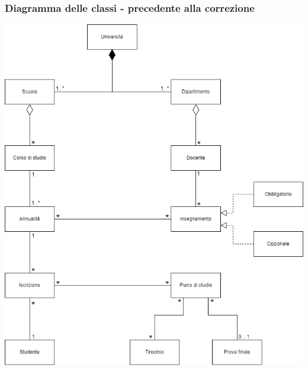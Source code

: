\documentclass{article}
\begin{document}
\subsubsection*{Diagramma delle classi - precedente alla correzione}\vspace*{27pt}
\begin{center}
    \includegraphics[width=1.05\textwidth]{foto 2.png}
\end{center}
\end{document}
